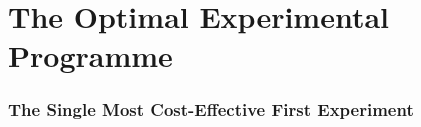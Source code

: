 \documentclass[11pt]{article}
\theoremstyle{definition}
\theoremstyle{remark}
\begin{document}
\part{The Optimal Experimental Programme}
\label{part:programme}

\section{The Single Most Cost-Effective First Experiment}
\label{sec:most_cost_effective}
\end{document}
